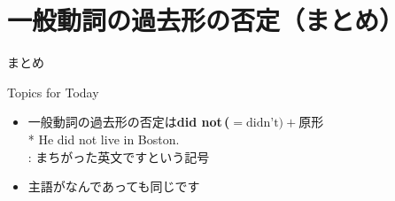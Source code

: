 \documentclass[aspectratio=169,xcolor={dvipsnames,table}]{beamer}
\begin{document}
\section{一般動詞の過去形の否定（まとめ）}
\begin{frame}[plain]{まとめ}
 \begin{exampleblock}{Topics for Today}
\small
\begin{itemize}[square]
 \item  一般動詞の過去形の否定は\textcolor{NavyBlue}{\bfseries did not\,($=\text{didn't)} + \text{原形}$}\hfill{} \\
\hfill{* He did not live in Boston.}\\
\hfill{\scriptsize *: まちがった英文ですという記号}

 \item  主語がなんであっても同じです
\end{itemize}
      \end{exampleblock}
\end{frame}
\end{document}
